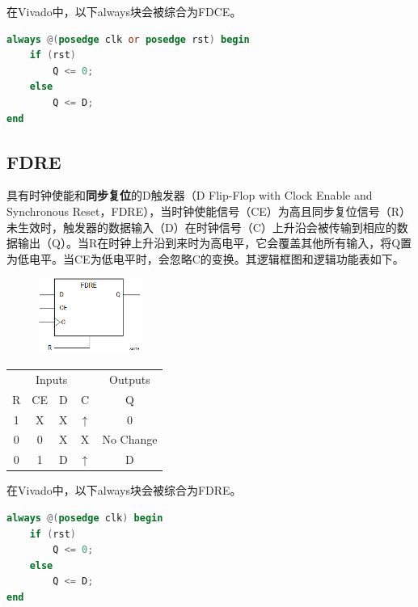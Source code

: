 \documentclass{ctexart}
\begin{document}
在Vivado中，以下always块会被综合为FDCE。

\begin{lstlisting}[language=Verilog]
always @(posedge clk or posedge rst) begin
    if (rst)
        Q <= 0;
    else
        Q <= D;
end
\end{lstlisting}

\subsection{FDRE}

具有时钟使能和\textbf{同步复位}的D触发器（D Flip-Flop with Clock Enable and Synchronous Reset，FDRE），当时钟使能信号（CE）为高且同步复位信号（R）未生效时，触发器的数据输入（D）在时钟信号（C）上升沿会被传输到相应的数据输出（Q）。当R在时钟上升沿到来时为高电平，它会覆盖其他所有输入，将Q置为低电平。当CE为低电平时，会忽略C的变换。其逻辑框图和逻辑功能表如下。

\begin{figure}[H]
    \centering
    \includegraphics[width=0.3\textwidth]{lab3/2.png}
\end{figure}

\begin{table}[H]
    \centering
    \begin{tabular}{ c c c c c }
        \hline
        \multicolumn{4}{c}{Inputs} & \multicolumn{1}{c}{Outputs} \\
        \cmidrule(r){1-4} \cmidrule(r){5-5}
        R & CE & D & C & Q \\
        \hline
        1 & X & X & $\uparrow$ & 0 \\
        0 & 0 & X & X & No Change \\
        0 & 1 & D & $\uparrow$ & D \\
        \hline
    \end{tabular}
\end{table}

在Vivado中，以下always块会被综合为FDRE。

\begin{lstlisting}[language=Verilog]
always @(posedge clk) begin
    if (rst)
        Q <= 0;
    else
        Q <= D;
end
\end{lstlisting}
\end{document}
